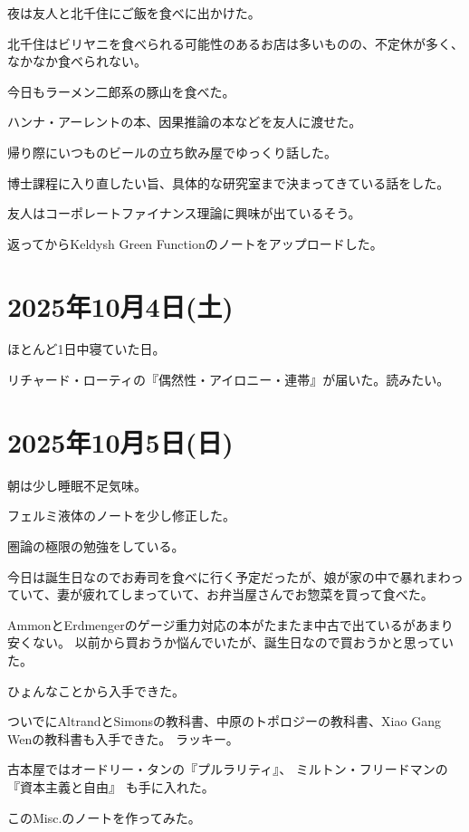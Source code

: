\documentclass[uplatex]{jsarticle}
\begin{document}
夜は友人と北千住にご飯を食べに出かけた。

北千住はビリヤニを食べられる可能性のあるお店は多いものの、不定休が多く、なかなか食べられない。

今日もラーメン二郎系の豚山を食べた。

ハンナ・アーレントの本、因果推論の本などを友人に渡せた。

帰り際にいつものビールの立ち飲み屋でゆっくり話した。

博士課程に入り直したい旨、具体的な研究室まで決まってきている話をした。

友人はコーポレートファイナンス理論に興味が出ているそう。

返ってからKeldysh Green Functionのノートをアップロードした。

\section{2025年10月4日(土)}

ほとんど1日中寝ていた日。

リチャード・ローティの『偶然性・アイロニー・連帯』が届いた。読みたい。



\section{2025年10月5日(日)}

朝は少し睡眠不足気味。

フェルミ液体のノートを少し修正した。

圏論の極限の勉強をしている。

今日は誕生日なのでお寿司を食べに行く予定だったが、娘が家の中で暴れまわっていて、妻が疲れてしまっていて、お弁当屋さんでお惣菜を買って食べた。

AmmonとErdmengerのゲージ重力対応の本がたまたま中古で出ているがあまり安くない。
以前から買おうか悩んでいたが、誕生日なので買おうかと思っていた。

ひょんなことから入手できた。

ついでにAltrandとSimonsの教科書、中原のトポロジーの教科書、Xiao Gang Wenの教科書も入手できた。
ラッキー。

古本屋ではオードリー・タンの『プルラリティ』、
ミルトン・フリードマンの『資本主義と自由』
も手に入れた。

このMisc.のノートを作ってみた。
\end{document}
